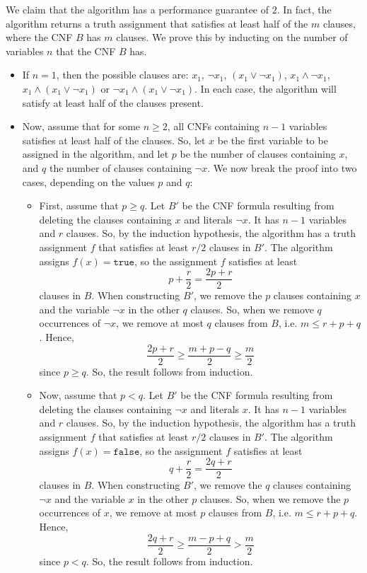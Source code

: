 \documentclass[a4paper, openany]{memoir}
\begin{document}
    We claim that the algorithm has a performance guarantee of $2$. In fact, the algorithm returns a truth assignment that satisfies at least half of the $m$ clauses, where the CNF $B$ has $m$ clauses. We prove this by inducting on the number of variables $n$ that the CNF $B$ has.
    \begin{itemize}
        \item If $n = 1$, then the possible clauses are: $x_1$, $\lnot x_1$, $(x_1 \lor \lnot x_1)$, $x_1 \land \lnot x_1$, $x_1 \land (x_1 \lor \lnot x_1)$ or $\lnot x_1 \land (x_1 \lor \lnot x_1)$. In each case, the algorithm will satisfy at least half of the clauses present.
        \item Now, assume that for some $n \geq 2$, all CNFs containing $n-1$ variables satisfies at least half of the clauses. So, let $x$ be the first variable to be assigned in the algorithm, and let $p$ be the number of clauses containing $x$, and $q$ the number of clauses containing $\lnot x$. We now break the proof into two cases, depending on the values $p$ and $q$:
        \begin{itemize}
            \item First, assume that $p \geq q$. Let $B'$ be the CNF formula resulting from deleting the clauses containing $x$ and literals $\lnot x$. It has $n-1$ variables and $r$ clauses. So, by the induction hypothesis, the algorithm has a truth assignment $f$ that satisfies at least $r/2$ clauses in $B'$. The algorithm assigns $f(x) = \texttt{true}$, so the assignment $f$ satisfies at least
            \[p + \frac{r}{2} = \frac{2p + r}{2}\]
            clauses in $B$. When constructing $B'$, we remove the $p$ clauses containing $x$ and the variable $\lnot x$ in the other $q$ clauses. So, when we remove $q$ occurrences of $\lnot x$, we remove at most $q$ clauses from $B$, i.e. $m \leq r + p + q$. Hence,
            \[\frac{2p + r}{2} \geq \frac{m + p - q}{2} \geq \frac{m}{2}\]
            since $p \geq q$. So, the result follows from induction.
            \item Now, assume that $p < q$. Let $B'$ be the CNF formula resulting from deleting the clauses containing $\lnot x$ and literals $x$. It has $n-1$ variables and $r$ clauses. So, by the induction hypothesis, the algorithm has a truth assignment $f$ that satisfies at least $r/2$ clauses in $B'$. The algorithm assigns $f(x) = \texttt{false}$, so the assignment $f$ satisfies at least
            \[q + \frac{r}{2} = \frac{2q + r}{2}\]
            clauses in $B$. When constructing $B'$, we remove the $q$ clauses containing $\lnot x$ and the variable $x$ in the other $p$ clauses. So, when we remove the $p$ occurrences of $x$, we remove at most $p$ clauses from $B$, i.e. $m \leq r + p + q$. Hence,
            \[\frac{2q + r}{2} \geq \frac{m - p + q}{2} > \frac{m}{2}\]
            since $p < q$. So, the result follows from induction.
        \end{itemize}
    \end{itemize}
\end{document}

